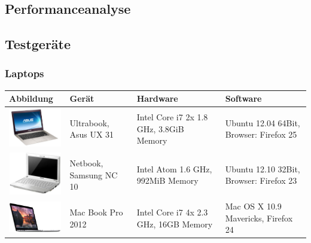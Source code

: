 \begin{landscape}

\chapter{Performanceanalyse}
	\label{performanceanalyse} 
	
	
	\section{Testgeräte}
	
		\subsection{Laptops}
		\begin{tabularx}{1.4\textwidth}{|l|XXX|}
			\hline
			\textbf{Abbildung} & \textbf{Gerät} & \textbf{Hardware} & \textbf{Software}\\
			\hline
			\includegraphics[width=3cm]{../performanceAnalaysis/devices/asusux21.png} &
			Ultrabook, Asus UX 31 & Intel Core i7 2x 1.8 GHz, 3.8GiB Memory & Ubuntu 12.04 64Bit, Browser: Firefox 25 \\
			\hline
			\includegraphics[width=3cm]{../performanceAnalaysis/devices/samsungnc10.jpg} & Netbook, Samsung NC 10 & Intel Atom 1.6 GHz, 992MiB Memory & Ubuntu 12.10 32Bit, Browser: Firefox 23 \\
			\hline
			\includegraphics[width=3cm]{../performanceAnalaysis/devices/macbookpro.jpg} & Mac Book Pro 2012 & Intel Core i7 4x 2.3 GHz, 16GB Memory & Mac OS X 10.9 Mavericks, Firefox 24 \\
			\hline
		\end{tabularx}
		

\end{landscape}
